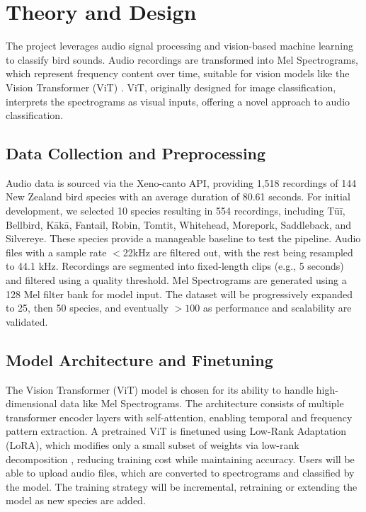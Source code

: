 \documentclass[conference,a4paper]{IEEEtran}
\begin{document}
\section{Theory and Design}
The project leverages audio signal processing and vision-based machine learning to classify bird sounds. 
Audio recordings are transformed into Mel Spectrograms, which represent frequency content over time, suitable for vision models like the Vision Transformer (ViT) \cite{b3}. 
ViT, originally designed for image classification, interprets the spectrograms as visual inputs, offering a novel approach to audio classification.

\subsection{Data Collection and Preprocessing}
Audio data is sourced via the Xeno-canto API, providing 1,518 recordings of 144 New Zealand bird species with an average duration of 80.61 seconds. 
For initial development, we selected 10 species resulting in 554 recordings, including Tūī, Bellbird, Kākā, Fantail, Robin, Tomtit, Whitehead, Morepork, Saddleback, and Silvereye. These species provide a manageable baseline to test the pipeline. 
Audio files with a sample rate $<$22kHz are filtered out, with the rest being resampled to 44.1 kHz. Recordings are segmented into fixed-length clips (e.g., 5 seconds) and filtered using a quality threshold. 
Mel Spectrograms are generated using a 128 Mel filter bank for model input. The dataset will be progressively expanded to 25, then 50 species, and eventually $>100$ as performance and scalability are validated.

\subsection{Model Architecture and Finetuning}
The Vision Transformer (ViT) model is chosen for its ability to handle high-dimensional data like Mel Spectrograms. 
The architecture consists of multiple transformer encoder layers with self-attention, enabling temporal and frequency pattern extraction. 
A pretrained ViT is finetuned using Low-Rank Adaptation (LoRA), which modifies only a small subset of weights via low-rank decomposition \cite{b4}, reducing training cost while maintaining accuracy. 
Users will be able to upload audio files, which are converted to spectrograms and classified by the model. The training strategy will be incremental, retraining or extending the model as new species are added.
\end{document}
